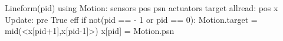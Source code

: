 Lineform(pid)
   using Motion:
      sensors pos psn
      actuators target
   allread: pos x $\label{lineformp}$
   Update:
      pre True
      eff if not(pid == \NMAX - 1 or pid == 0):
         Motion.target = mid(<x[pid+1],x[pid-1]>)
         x[pid] = Motion.psn

